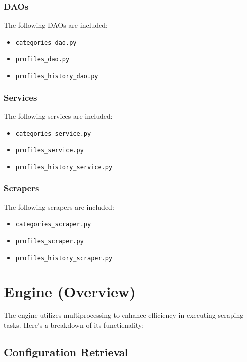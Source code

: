 {\begin{itemize}
	\end{itemize}

	\subsubsection{DAOs}

	The following DAOs are included:

	\begin{itemize}
		\item \texttt{categories\_dao.py}
		\item \texttt{profiles\_dao.py}
		\item \texttt{profiles\_history\_dao.py}
	\end{itemize}

	\subsubsection{Services}

	The following services are included:

	\begin{itemize}
		\item \texttt{categories\_service.py}
		\item \texttt{profiles\_service.py}
		\item \texttt{profiles\_history\_service.py}
	\end{itemize}

	\subsubsection{Scrapers}

	The following scrapers are included:

	\begin{itemize}
		\item \texttt{categories\_scraper.py}
		\item \texttt{profiles\_scraper.py}
		\item \texttt{profiles\_history\_scraper.py}
	\end{itemize}
	\newpage
	\section{Engine (Overview)}
	The engine utilizes multiprocessing to enhance efficiency in executing scraping tasks. Here's a breakdown of its functionality:

	\subsection*{Configuration Retrieval}

}
